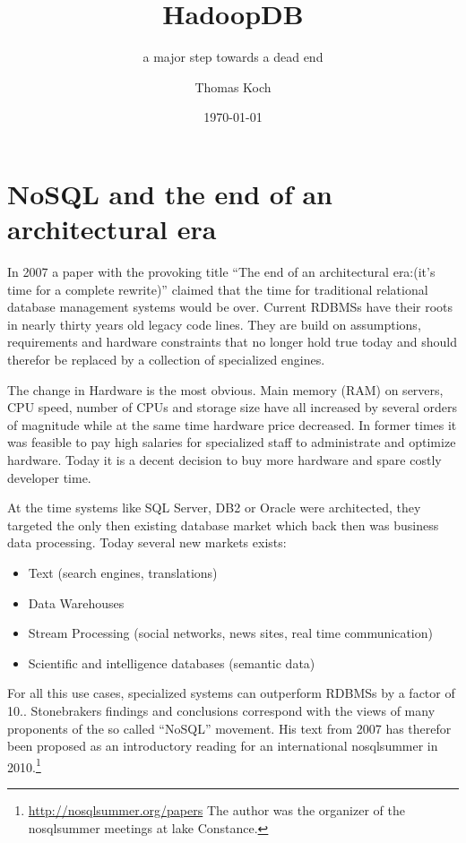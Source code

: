 \documentclass[12pt,a4paper]{scrartcl}		%
\begin{document}
\title{HadoopDB}
\subtitle{a major step towards a dead end}
\author{Thomas Koch}
\date{\today}
\maketitle{}

\begin{abstract}
  
\end{abstract}
\tableofcontents{}

\section{NoSQL and the end of an architectural era}
In 2007 a paper with the provoking title ``The end of an architectural era:(it's time for a complete rewrite)''\cite{sto07} claimed that the time for traditional relational database management systems would be over. Current RDBMSs have their roots in nearly thirty years old legacy code lines. They are build on assumptions, requirements and hardware constraints that no longer hold true today and should therefor be replaced by a collection of specialized engines.

The change in Hardware is the most obvious. Main memory (RAM) on servers, CPU speed, number of CPUs and storage size have all increased by several orders of magnitude while at the same time hardware price decreased. In former times it was feasible to pay high salaries for specialized staff to administrate and optimize hardware. Today it is a decent decision to buy more hardware and spare costly developer time.

At the time systems like SQL Server, DB2 or Oracle were architected, they targeted the only then existing database market which back then was business data processing. Today several new markets exists:

\begin{itemize}
\item Text (search engines, translations)
\item Data Warehouses
\item Stream Processing (social networks, news sites, real time communication)
\item Scientific and intelligence databases (semantic data)
\end{itemize}

For all this use cases, specialized systems can outperform RDBMSs by a factor of 10.\cite{conf/cidr/StonebrakerBCCGHHLRZ07}. Stonebrakers findings and conclusions correspond with the views of many proponents of the so called ``NoSQL'' movement. His text from 2007 has therefor been proposed as an introductory reading for an international nosqlsummer in 2010.\footnote{\url{http://nosqlsummer.org/papers} The author was the organizer of the nosqlsummer meetings at lake Constance.} 
\end{document}
